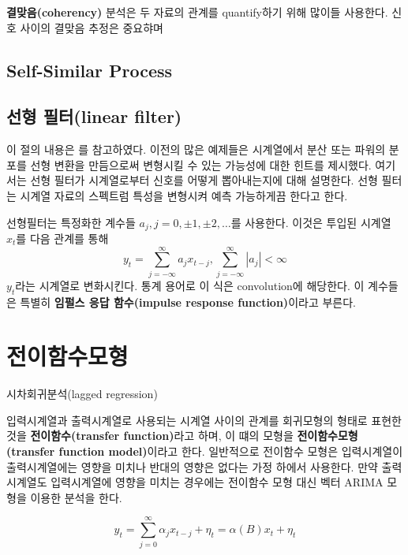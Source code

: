 \documentclass[b5paper,]{scrbook}
\theoremstyle{plain}
\theoremstyle{definition}
\numberwithin{equation}{section}
\begin{document}
\textbf{결맞음(coherency)} 분석은 두 자료의 관계를 quantify하기 위해 많이들 사용한다. 신호 사이의 결맞음 추정은 중요햐며

\hypertarget{self-similar-process-1}{%
\section{Self-Similar Process}\label{self-similar-process-1}}

\hypertarget{-linear-filter}{%
\section{선형 필터(linear filter)}\label{-linear-filter}}

이 절의 내용은 \citep{Shumway2010}를 참고하였다. 이전의 많은 예제들은 시계열에서 분산 또는 파워의 분포를 선형 변환을 만듬으로써 변형시킬 수 있는 가능성에 대한 힌트를 제시했다. 여기서는 선형 필터가 시계열로부터 신호를 어떻게 뽑아내는지에 대해 설명한다. 선형 필터는 시계열 자료의 스펙트럼 특성을 변형시켜 예측 가능하게끔 한다고 한다.

선형필터는 특정화한 계수들 \(a_{j}, j=0,\pm 1, \pm 2, \ldots\)를 사용한다. 이것은 투입된 시계열 \(x_{t}\)를 다음 관계를 통해
\[y_{t}=\sum_{j=-\infty}^{\infty}a_{j}x_{t-j}, \sum_{j=-\infty}^{\infty}|a_{j}| <\infty\]
\(y_{t}\)라는 시계열로 변화시킨다. 통계 용어로 이 식은 convolution에 해당한다. 이 계수들은 특별히 \textbf{임펄스 응답 함수(impulse response function)}이라고 부른다.

\hypertarget{transfer}{%
\chapter{전이함수모형}\label{transfer}}

시차회귀분석(lagged regression)

입력시계열과 출력시계열로 사용되는 시계열 사이의 관계를 회귀모형의 형태로 표현한 것을 \textbf{전이함수(transfer function)}라고 하며, 이 떄의 모형을 \textbf{전이함수모형(transfer function model)}이라고 한다. 일반적으로 전이함수 모형은 입력시계열이 출력시계열에는 영향을 미치나 반대의 영향은 없다는 가정 하에서 사용한다. 만약 출력시계열도 입력시계열에 영향을 미치는 경우에는 전이함수 모형 대신 벡터 ARIMA 모형을 이용한 분석을 한다.

\begin{equation}
y_{t}=\sum_{j=0}^{\infty}\alpha_{j}x_{t-j}+\eta_{t}=\alpha(B)x_{t}+\eta_{t}
\label{eq:lagreg}
\end{equation}
\end{document}
